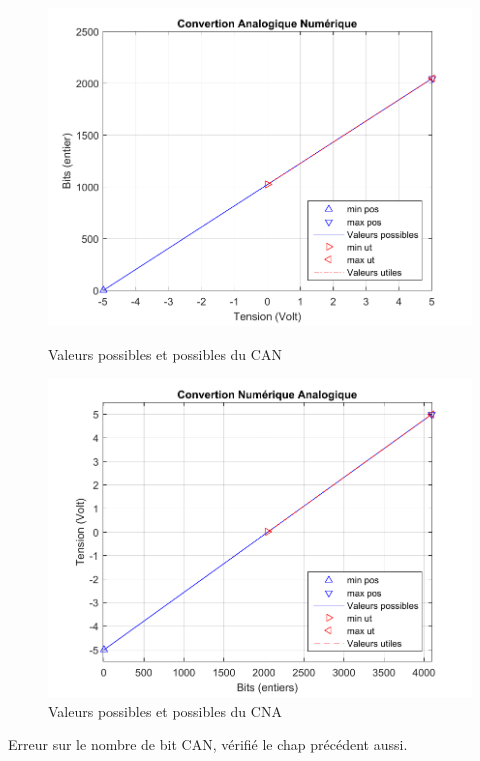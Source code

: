 \begin{figure}[!ht]%
\begin{minipage}{.5\textwidth}%
\centering
\includegraphics[width=\textwidth]{./VI/images/CAN_plage.pdf}
\caption{\label{fig:CAN_p}Valeurs possibles et possibles du CAN}
\end{minipage}%
\hfill%
\begin{minipage}{.5\textwidth}%
\centering
\includegraphics[width=\textwidth]{./VI/images/CNA_plage.pdf}
\caption{\label{fig:CNA_p}Valeurs possibles et possibles du CNA}
\end{minipage}%
\end{figure}
\begin{LARGE}
Erreur sur le nombre de bit CAN, vérifié le chap précédent aussi.
\end{LARGE}
